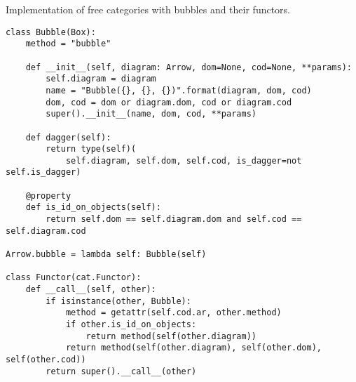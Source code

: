 \begin{python}
{\normalfont Implementation of free categories with bubbles and their functors.}

\begin{verbatim}
class Bubble(Box):
    method = "bubble"

    def __init__(self, diagram: Arrow, dom=None, cod=None, **params):
        self.diagram = diagram
        name = "Bubble({}, {}, {})".format(diagram, dom, cod)
        dom, cod = dom or diagram.dom, cod or diagram.cod
        super().__init__(name, dom, cod, **params)

    def dagger(self):
        return type(self)(
            self.diagram, self.dom, self.cod, is_dagger=not self.is_dagger)

    @property
    def is_id_on_objects(self):
        return self.dom == self.diagram.dom and self.cod == self.diagram.cod

Arrow.bubble = lambda self: Bubble(self)

class Functor(cat.Functor):
    def __call__(self, other):
        if isinstance(other, Bubble):
            method = getattr(self.cod.ar, other.method)
            if other.is_id_on_objects:
                return method(self(other.diagram))
            return method(self(other.diagram), self(other.dom), self(other.cod))
        return super().__call__(other)
\end{verbatim}
\end{python}

